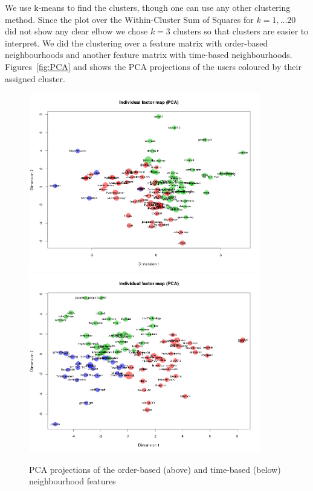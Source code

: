 \documentclass[conference]{IEEEtran}
\begin{document}
We use k-means to find the clusters, though one can use any other clustering method. Since the plot over the Within-Cluster Sum of Squares for $k=1,...20$ did not show any clear elbow we chose $k=3$ clusters so that clusters are easier to interpret. We did the clustering over a feature matrix with order-based neighbourhoods and another feature matrix with time-based neighbourhoods. Figures~\ref{fig:PCA} and shows the PCA projections of the users coloured by their assigned cluster. 


\begin{figure}
	\centering
	\includegraphics[width=0.9\textwidth]{PCA_cluster_orderbased}
	\includegraphics[width=0.9\textwidth]{PCA_cluster_timebased}
	\caption{PCA projections of the order-based (above) and time-based (below) neighbourhood features}
	\label{fig:neighbourhoods_time}
\end{figure}
\end{document}

